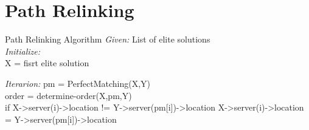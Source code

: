 \section{Path Relinking}
\begin{frame}{Path Relinking Algorithm}{}
  \textit{Given:}
  List of elite solutions \\
  \textit{Initialize:} \\
  X = fisrt elite solution \hfill
  
  \textit{Iterarion:}
  pm = PerfectMatching(X,Y)\\
  order = determine-order(X,pm,Y)\\
  if X->server(i)->location != Y->server(pm[i])->location
  X->server(i)->location = Y->server(pm[i])->location
\end{frame}
